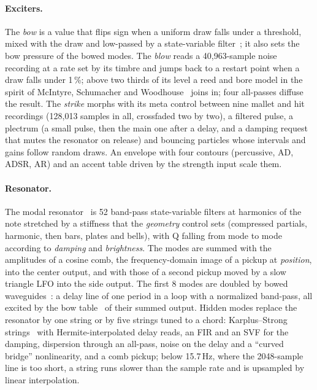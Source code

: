 \documentclass[10pt,a4paper,twocolumn]{article}
\begin{document}
\paragraph{Exciters.} The \emph{bow} is a value that flips sign when a uniform draw falls under a threshold, mixed with the draw and low-passed by a state-variable filter~\cite{zavalishin2012}; it also sets the bow pressure of the bowed modes. The \emph{blow} reads a 40,963-sample noise recording at a rate set by its timbre and jumps back to a restart point when a draw falls under 1\,\%; above two thirds of its level a reed and bore model in the spirit of McIntyre, Schumacher and Woodhouse~\cite{mcintyre1983} joins in; four all-passes diffuse the result. The \emph{strike} morphs with its meta control between nine mallet and hit recordings (128,013 samples in all, crossfaded two by two), a filtered pulse, a plectrum (a small pulse, then the main one after a delay, and a damping request that mutes the resonator on release) and bouncing particles whose intervals and gains follow random draws. An envelope with four contours (percussive, AD, ADSR, AR) and an accent table driven by the strength input scale them.

\paragraph{Resonator.} The modal resonator~\cite{adrien1991} is 52 band-pass state-variable filters at harmonics of the note stretched by a stiffness that the \emph{geometry} control sets (compressed partials, harmonic, then bars, plates and bells), with Q falling from mode to mode according to \emph{damping} and \emph{brightness}. The modes are summed with the amplitudes of a cosine comb, the frequency-domain image of a pickup at \emph{position}, into the center output, and with those of a second pickup moved by a slow triangle LFO into the side output. The first 8 modes are doubled by bowed waveguides~\cite{essl1999}: a delay line of one period in a loop with a normalized band-pass, all excited by the bow table~\cite{cook1999} of their summed output. Hidden modes replace the resonator by one string or by five strings tuned to a chord: Karplus--Strong strings~\cite{karplus1983,jaffe1983,smith1992} with Hermite-interpolated delay reads, an FIR and an SVF for the damping, dispersion through an all-pass, noise on the delay and a ``curved bridge'' nonlinearity, and a comb pickup; below 15.7\,Hz, where the 2048-sample line is too short, a string runs slower than the sample rate and is upsampled by linear interpolation.
\end{document}
